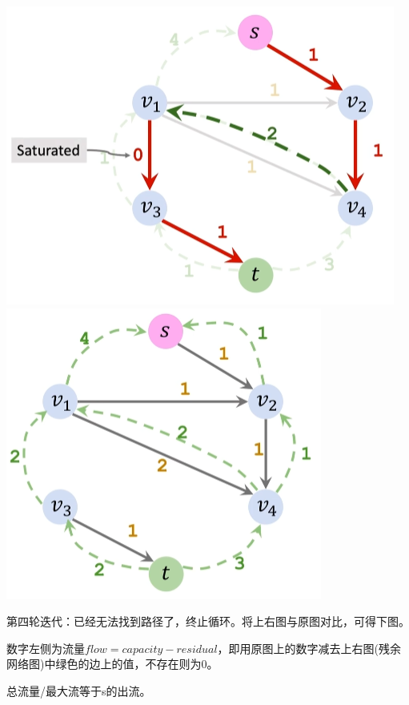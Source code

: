 \documentclass[a4paper]{article}    %
\begin{document}
\begin{center}
    \includegraphics[scale=0.5]{32.png}
    \includegraphics[scale=0.5]{33.png}
\end{center}

第四轮迭代：已经无法找到路径了，终止循环。将上右图与原图对比，可得下图。

数字左侧为流量$flow = capacity-residual$，即用原图上的数字减去上右图(残余网络图)中绿色的边上的值，不存在则为0。

总流量/最大流等于s的出流。
\end{document}
